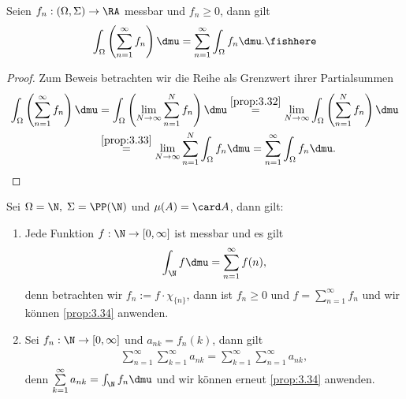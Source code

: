 \begin{cor}
\label{prop:3.34}
Seien $f_n: (\Omega,\Sigma)\to \RA$ messbar und $f_n\ge 0$, dann gilt
\begin{align*}
\int_\Omega \left( \sum\limits_{n=1}^\infty f_n  \right) \dmu
= \sum\limits_{n=1}^\infty \int_\Omega f_n \dmu.\fishhere
\end{align*}
\end{cor}
\begin{proof}
Zum Beweis betrachten wir die Reihe als Grenzwert ihrer Partialsummen
\begin{align*}
\int_\Omega \left( \sum\limits_{n=1}^\infty f_n  \right) \dmu
&= \int_\Omega \left( \lim\limits_{N\to\infty} \sum\limits_{n=1}^N f_n 
\right) \dmu
\overset{\ref{prop:3.32}}{=}
\lim\limits_{N\to\infty} \int_\Omega \left(  \sum\limits_{n=1}^N f_n 
\right) \dmu
\\ &\overset{\ref{prop:3.33}}{=} \lim\limits_{N\to\infty} \sum\limits_{n=1}^N
\int_\Omega f_n \dmu
= \sum\limits_{n=1}^\infty \int_\Omega f_n\dmu.\qedhere
\end{align*}
\end{proof}

\begin{bsp}
\label{bsp:3.35}
Sei $\Omega = \N,\;\Sigma = \PP(\N)$ und $\mu(A) = \card A$, dann gilt:
\begin{enumerate}[label=\arabic{*}.)]
  \item Jede Funktion $f: \N\to[0,\infty]$ ist messbar und es gilt
  \begin{align*}
  \int_\N f \dmu = \sum\limits_{n=1}^\infty f(n),
  \end{align*}
denn betrachten wir $f_n:= f\cdot\chi_{\{n\}}$, dann ist $f_n \ge 0$ und $f =
\sum\limits_{n=1}^\infty f_n$ und wir können \ref{prop:3.34} anwenden.
\item
Sei $f_n: \N\to[0,\infty]$ und $a_{nk} = f_n(k)$, dann gilt
\begin{align*}
\sum\limits_{n=1}^\infty \sum\limits_{k=1}^\infty a_{nk} =
\sum\limits_{k=1}^\infty \sum\limits_{n=1}^\infty a_{nk},  
\end{align*}
denn $\sum\limits_{k=1}^\infty a_{nk} = \int_\N f_n \dmu$ und wir können erneut
\ref{prop:3.34} anwenden.\bsphere
\end{enumerate}
\end{bsp}

